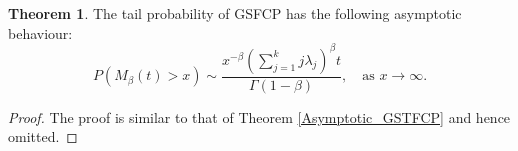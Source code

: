 \documentclass[11pt,oneside,reqno]{amsart}
\theoremstyle{definition}
\newtheorem{theorem}{\bf Theorem}[section]
\theoremstyle{remarkstyle}
\begin{document}
\begin{theorem}\label{Asymptotic_GSFCP}
The tail probability of GSFCP has the following asymptotic behaviour:
\begin{equation*}
P(M_{\beta}(t)>x)\sim\frac{x^{-\beta} (\sum_{j=1}^{k}j\lambda_j)^{\beta}t}{\Gamma(1-\beta)} ,\quad\text{as}\,\, x\to \infty.
\end{equation*}
\end{theorem}

\begin{proof}
The proof is similar to that of Theorem \ref{Asymptotic_GSTFCP} and hence omitted.
\end{proof}

\end{document}

